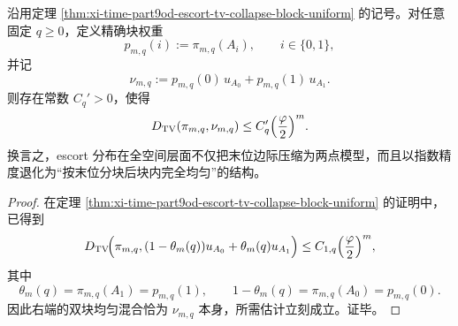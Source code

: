 \begin{proposition}\label{prop:xi-time-part9od-escort-tv-collapse-exact-block-weights}
沿用定理 \ref{thm:xi-time-part9od-escort-tv-collapse-block-uniform} 的记号。对任意固定 \(q\ge 0\)，定义精确块权重
\[
p_{m,q}(i):=\pi_{m,q}(A_i),
\qquad i\in\{0,1\},
\]
并记
\[
\nu_{m,q}:=
p_{m,q}(0)\,u_{A_0}+p_{m,q}(1)\,u_{A_1}.
\]
则存在常数 \(C_q'>0\)，使得
\[
D_{\mathrm{TV}}(\pi_{m,q},\nu_{m,q})
\le
C_q'\Bigl(\frac{\varphi}{2}\Bigr)^m.
\]
换言之，escort 分布在全空间层面不仅把末位边际压缩为两点模型，而且以指数精度退化为“按末位分块后块内完全均匀”的结构。
\end{proposition}
\begin{proof}
在定理 \ref{thm:xi-time-part9od-escort-tv-collapse-block-uniform} 的证明中，已得到
\[
D_{\mathrm{TV}}\!\Bigl(
\pi_{m,q},
(1-\theta_m(q))u_{A_0}+\theta_m(q)u_{A_1}
\Bigr)
\le
C_{1,q}\Bigl(\frac{\varphi}{2}\Bigr)^m,
\]
其中
\[
\theta_m(q)=\pi_{m,q}(A_1)=p_{m,q}(1),
\qquad
1-\theta_m(q)=\pi_{m,q}(A_0)=p_{m,q}(0).
\]
因此右端的双块均匀混合恰为 \(\nu_{m,q}\) 本身，所需估计立刻成立。证毕。
\end{proof}

